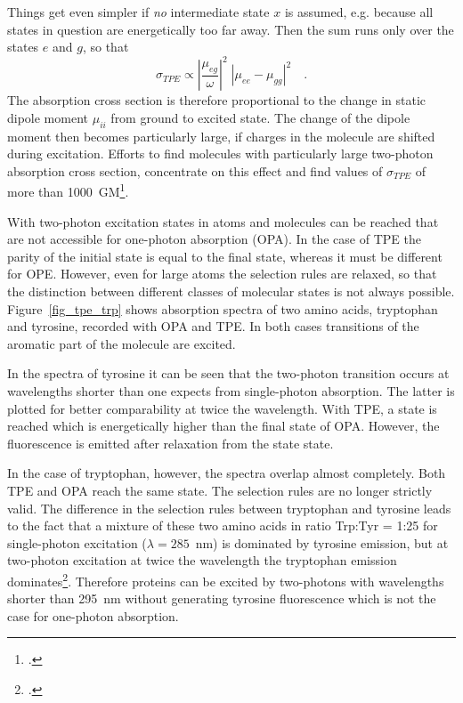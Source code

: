 Things get even simpler if 
\emph{no} intermediate state $x$ is assumed, e.g. because all states in
question are energetically too far away. Then the
sum runs only over the states $e$ and $g$, so that
\begin{equation}
\sigma_{TPE} \propto \left| \frac{\mu_{eg}}{\omega} \right|^2 \;
\left| \mu_{ee} -  \mu_{gg} \right|^2 \quad .
\end{equation}
The absorption cross section is therefore proportional to the change in
static dipole moment $\mu_{ii}$ from ground to excited
state. The change of the dipole moment then becomes particularly large,
if charges in the molecule are shifted during excitation.
Efforts to find molecules with particularly large
two-photon absorption cross section,
concentrate on this effect and find values of  $\sigma_{TPE}$ of more than 1000~GM\footcite{albota98}.

 

With two-photon excitation 
states in atoms and molecules can be reached that are not accessible for
 one-photon absorption (OPA).
In the case of TPE  the parity of the
initial state is equal to the final state, whereas it
must be different for OPE.  However, even for
large atoms the selection rules are relaxed, so that the distinction between
different classes of molecular states is not always
 possible. Figure~\ref{fig_tpe_trp} shows
absorption spectra of two amino acids, tryptophan and tyrosine,
recorded with OPA and TPE. In both cases
transitions of the aromatic part of the molecule are excited. 

In the spectra of tyrosine it can be seen that the
two-photon transition occurs at wavelengths shorter than one expects from 
 single-photon absorption. The latter is plotted for better
comparability at twice the wavelength. With
TPE, a state is reached which is energetically higher than the final state of   OPA. However, the fluorescence is emitted after relaxation from the state state.


In the case of tryptophan, however, the spectra overlap almost 
completely. Both  TPE and  OPA reach the same state.
The selection rules are no longer strictly valid. The
difference in the selection rules between tryptophan and tyrosine
leads to the fact that a mixture of these two amino acids in
ratio Trp:Tyr = 1:25 for single-photon excitation ($\lambda =
285$~nm) is dominated by tyrosine emission,  but at
two-photon excitation at twice the wavelength  the
tryptophan emission dominates\footcite{kierdaszuk95}. Therefore proteins can be excited by two-photons with  wavelengths shorter than 295~nm
without generating tyrosine fluorescence which is not the case for one-photon absorption.















